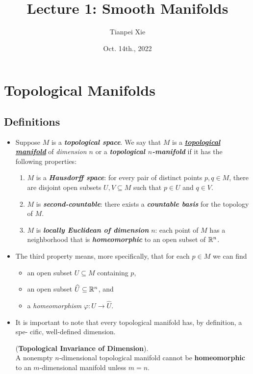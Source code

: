 \documentclass[11pt]{article}
\begin{document}
\title{Lecture 1: Smooth Manifolds}
\author{ Tianpei Xie}
\date{Oct. 14th., 2022}
\maketitle
\tableofcontents
\newpage
\section{Topological Manifolds}
\subsection{Definitions}
\begin{itemize}
\item \begin{definition}
Suppose $M$ is a \emph{\textbf{topological space}}. We say that $M$ is a \underline{\emph{\textbf{topological manifold}}} of \emph{dimension $n$} or a \emph{\textbf{topological $n$-manifold}} if it has the following properties:
\begin{enumerate}
\item $M$ is a \emph{\textbf{Hausdorff space}}: for every pair of distinct points $p, q \in M$, there are disjoint open subsets $U, V \subseteq M$ such that $p \in U$ and $q \in V$.
\item $M$ is \emph{\textbf{second-countable}}: there exists a \emph{\textbf{countable basis}} for the topology of $M$.
\item $M$ is \emph{\textbf{locally Euclidean of dimension}} $n$: each point of $M$ has a neighborhood that is \emph{\textbf{homeomorphic}} to an open subset of ${\mathbb R}^n$. 
\end{enumerate}
\end{definition}

\item The third property means, more specifically, that for each $p \in M$ we can find
\begin{itemize}
\item an open subset $U \subseteq M$ containing $p$,
\item an open subset $\widehat{U}\subseteq {\mathbb R}^n$, and
\item a \emph{homeomorphism} $\varphi: U\rightarrow \widehat{U}$.
\end{itemize}

\item It is important to note that every topological manifold has, by definition, a spe- cific, well-defined dimension.
\begin{theorem} (\textbf{Topological Invariance of Dimension}).\\
A nonempty $n$-dimensional topological manifold cannot be \textbf{homeomorphic} to an $m$-dimensional manifold unless $m = n$.
\end{theorem}


\end{itemize}
\end{document}
